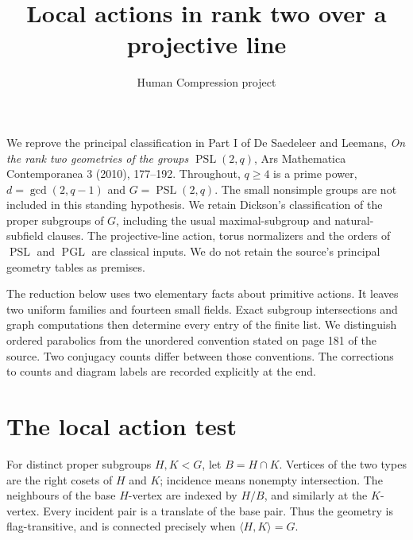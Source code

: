 \documentclass[11pt,a4paper]{article}
\title{Local actions in rank two over a projective line}
\author{Human Compression project}\date{}
\newcommand{\PSL}{\operatorname{PSL}}\newcommand{\PGL}{\operatorname{PGL}}
\begin{document}
\maketitle
We reprove the principal classification in Part I of De Saedeleer and
Leemans, \emph{On the rank two geometries of the groups $\PSL(2,q)$},
Ars Mathematica Contemporanea 3 (2010), 177--192. Throughout, $q\ge4$
is a prime power, $d=\gcd(2,q-1)$ and $G=\PSL(2,q)$. The small
nonsimple groups are not included in this standing hypothesis.
We retain Dickson's classification of the proper subgroups of $G$, including
the usual maximal-subgroup and natural-subfield clauses. The projective-line
action, torus normalizers and the orders of $\PSL$ and $\PGL$ are classical
inputs. We do not retain the source's principal geometry tables as premises.

The reduction below uses two elementary facts about primitive actions.
It leaves two uniform families and fourteen small fields. Exact subgroup
intersections and graph computations then determine every entry of the
finite list. We distinguish ordered parabolics from the unordered convention
stated on page 181 of the source. Two conjugacy counts differ between those
conventions. The corrections to counts and diagram labels are recorded
explicitly at the end.

\section{The local action test}
For distinct proper subgroups $H,K<G$, let $B=H\cap K$. Vertices of the
two types are the right cosets of $H$ and $K$; incidence means nonempty
intersection. The neighbours of the base $H$-vertex are indexed by $H/B$,
and similarly at the $K$-vertex. Every incident pair is a translate of the
base pair. Thus the geometry is flag-transitive, and is connected precisely
when $\langle H,K\rangle=G$.
\end{document}
